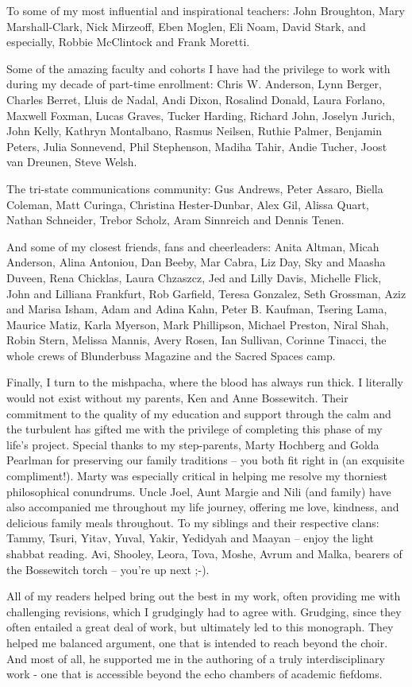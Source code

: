 To some of my most influential and inspirational teachers: John
Broughton, Mary Marshall-Clark, Nick Mirzeoff, Eben Moglen, Eli Noam,
David Stark, and especially, Robbie McClintock and Frank Moretti.

Some of the amazing faculty and cohorts I have had the privilege to work
with during my decade of part-time enrollment: Chris W. Anderson, Lynn
Berger, Charles Berret, Lluis de Nadal, Andi Dixon, Rosalind Donald,
Laura Forlano, Maxwell Foxman, Lucas Graves, Tucker Harding, Richard
John, Joselyn Jurich, John Kelly, Kathryn Montalbano, Rasmus Neilsen,
Ruthie Palmer, Benjamin Peters, Julia Sonnevend, Phil Stephenson, Madiha
Tahir, Andie Tucher, Joost van Dreunen, Steve Welsh.

The tri-state communications community: Gus Andrews, Peter Assaro,
Biella Coleman, Matt Curinga, Christina Hester-Dunbar, Alex Gil, Alissa
Quart, Nathan Schneider, Trebor Scholz, Aram Sinnreich and Dennis Tenen.

And some of my closest friends, fans and cheerleaders: Anita Altman,
Micah Anderson, Alina Antoniou, Dan Beeby, Mar Cabra, Liz Day, Sky and
Maasha Duveen, Rena Chicklas, Laura Chzaszcz, Jed and Lilly Davis,
Michelle Flick, John and Lilliana Frankfurt, Rob Garfield, Teresa
Gonzalez, Seth Grossman, Aziz and Marisa Isham, Adam and Adina Kahn,
Peter B. Kaufman, Tsering Lama, Maurice Matiz, Karla Myerson, Mark
Phillipson, Michael Preston, Niral Shah, Robin Stern, Melissa Mannis,
Avery Rosen, Ian Sullivan, Corinne Tinacci, the whole crews of
Blunderbuss Magazine and the Sacred Spaces camp.

Finally, I turn to the mishpacha, where the blood has always run thick.
I literally would not exist without my parents, Ken and Anne Bossewitch.
Their commitment to the quality of my education and support through the
calm and the turbulent has gifted me with the privilege of completing
this phase of my life's project. Special thanks to my step-parents,
Marty Hochberg and Golda Pearlman for preserving our family traditions
-- you both fit right in (an exquisite compliment!). Marty was
especially critical in helping me resolve my thorniest philosophical
conundrums. Uncle Joel, Aunt Margie and Nili (and family) have also
accompanied me throughout my life journey, offering me love, kindness,
and delicious family meals throughout. To my siblings and their
respective clans: Tammy, Tsuri, Yitav, Yuval, Yakir, Yedidyah and Maayan
-- enjoy the light shabbat reading. Avi, Shooley, Leora, Tova, Moshe,
Avrum and Malka, bearers of the Bossewitch torch -- you're up next ;-).

All of my readers helped bring out the best in my work, often providing
me with challenging revisions, which I grudgingly had to agree with.
Grudging, since they often entailed a great deal of work, but ultimately
led to this monograph. They helped me balanced argument, one that is
intended to reach beyond the choir. And most of all, he supported me in
the authoring of a truly interdisciplinary work - one that is accessible
beyond the echo chambers of academic fiefdoms.
